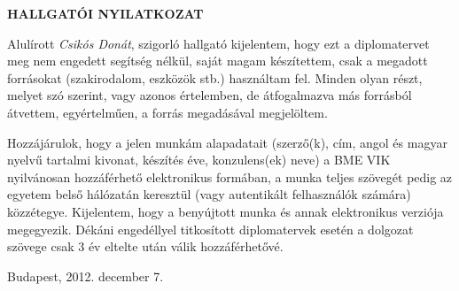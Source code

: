 \begin{center} 
\large
\textbf{HALLGATÓI NYILATKOZAT}\\
\end{center}

Alulírott \emph{Csikós Donát}, szigorló hallgató kijelentem, hogy ezt a
diplomatervet meg nem  engedett segítség
nélkül, saját magam készítettem, csak a megadott forrásokat (szakirodalom,
eszközök stb.) használtam fel. Minden olyan részt, melyet szó szerint, vagy
azonos értelemben, de átfogalmazva más forrásból átvettem, egyértelműen, a
forrás megadásával megjelöltem.

Hozzájárulok, hogy a jelen munkám alapadatait (szerző(k), cím, angol és magyar
nyel\-vű tartalmi kivonat, készítés éve, konzulens(ek) neve) a BME VIK
nyilvánosan hozzáférhető elektronikus formában, a munka teljes szövegét pedig
az egyetem belső hálózatán keresztül (vagy autentikált felhasználók számára)
közzétegye. Kijelentem, hogy a benyújtott munka és annak elektronikus verziója
megegyezik. Dékáni engedéllyel titkosított diplomatervek esetén a dolgozat
szövege csak 3 év eltelte után válik hozzáférhetővé.

\begin{flushleft}
\vspace*{1cm}
Budapest, 2012. december 7.
\end{flushleft}

\begin{flushright}
 \vspace*{1cm}
 \makebox[7cm]{\rule{6cm}{.4pt}}\\
 \\
\end{flushright}
\thispagestyle{empty}

\vfill
\clearpage
\thispagestyle{empty} %